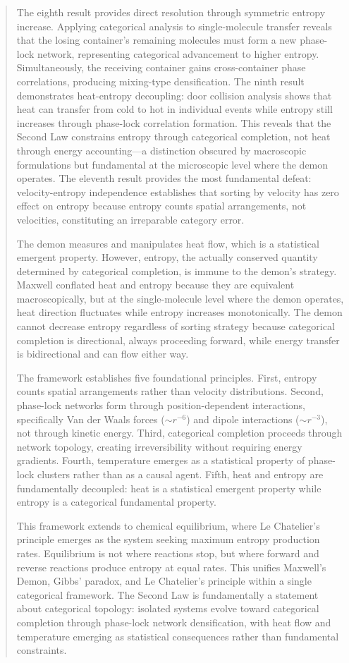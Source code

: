 \documentclass[12pt,a4paper]{article}
\theoremstyle{definition}
\theoremstyle{remark}
\begin{document}
\begin{abstract}
  The eighth result provides direct resolution through symmetric entropy increase. Applying categorical analysis to single-molecule transfer reveals that the losing container's remaining molecules must form a new phase-lock network, representing categorical advancement to higher entropy. Simultaneously, the receiving container gains cross-container phase correlations, producing mixing-type densification. The ninth result demonstrates heat-entropy decoupling: door collision analysis shows that heat can transfer from cold to hot in individual events while entropy still increases through phase-lock correlation formation. This reveals that the Second Law constrains entropy through categorical completion, not heat through energy accounting---a distinction obscured by macroscopic formulations but fundamental at the microscopic level where the demon operates. The eleventh result provides the most fundamental defeat: velocity-entropy independence establishes that sorting by velocity has zero effect on entropy because entropy counts spatial arrangements, not velocities, constituting an irreparable category error.

  The demon measures and manipulates heat flow, which is a statistical emergent property. However, entropy, the actually conserved quantity determined by categorical completion, is immune to the demon's strategy. Maxwell conflated heat and entropy because they are equivalent macroscopically, but at the single-molecule level where the demon operates, heat direction fluctuates while entropy increases monotonically. The demon cannot decrease entropy regardless of sorting strategy because categorical completion is directional, always proceeding forward, while energy transfer is bidirectional and can flow either way.

  The framework establishes five foundational principles. First, entropy counts spatial arrangements rather than velocity distributions. Second, phase-lock networks form through position-dependent interactions, specifically Van der Waals forces ($\sim r^{-6}$) and dipole interactions ($\sim r^{-3}$), not through kinetic energy. Third, categorical completion proceeds through network topology, creating irreversibility without requiring energy gradients. Fourth, temperature emerges as a statistical property of phase-lock clusters rather than as a causal agent. Fifth, heat and entropy are fundamentally decoupled: heat is a statistical emergent property while entropy is a categorical fundamental property.

  This framework extends to chemical equilibrium, where Le Chatelier's principle emerges as the system seeking maximum entropy production rates. Equilibrium is not where reactions stop, but where forward and reverse reactions produce entropy at equal rates. This unifies Maxwell's Demon, Gibbs' paradox, and Le Chatelier's principle within a single categorical framework. The Second Law is fundamentally a statement about categorical topology: isolated systems evolve toward categorical completion through phase-lock network densification, with heat flow and temperature emerging as statistical consequences rather than fundamental constraints.


\end{abstract}
\end{document}
